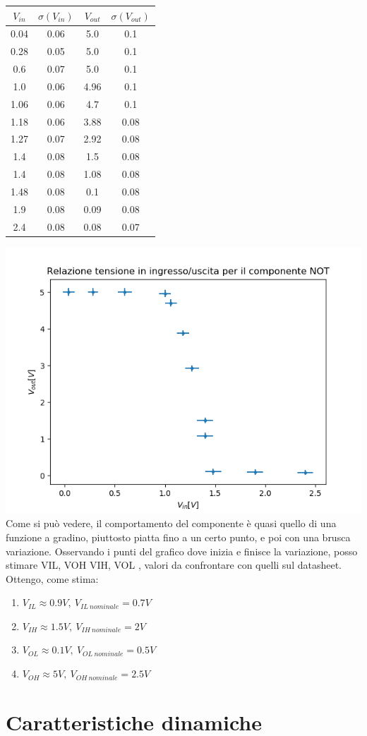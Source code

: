 \documentclass[10pt,a4paper]{article}
\begin{document}
	\begin{center}
\begin{tabular}{|c|c|c|c|}
	\hline 
	$V_{in}$ & $\sigma(V_{in})$ & $V_{out}$ & $\sigma(V_{out})$ \\ 
	\hline 
	0.04&0.06&5.0&0.1\\ \hline
	0.28&0.05&5.0&0.1\\ \hline
	0.6&0.07&5.0&0.1\\ \hline
	1.0&0.06&4.96&0.1\\ \hline
	1.06&0.06&4.7&0.1\\ \hline
	1.18&0.06&3.88&0.08\\ \hline
	1.27&0.07&2.92&0.08\\ \hline
	1.4&0.08&1.5&0.08\\ \hline
	1.4&0.08&1.08&0.08\\ \hline
	1.48&0.08&0.1&0.08\\ \hline
	1.9&0.08&0.09&0.08\\ \hline
	2.4&0.08&0.08&0.07\\ \hline
\end{tabular} 
	\end{center}
\includegraphics[scale=0.5]{gain.png}\centering
\\Come si può vedere, il comportamento del componente è quasi quello di una funzione a gradino, piuttosto piatta fino a un certo punto, e poi con una brusca variazione.
Osservando i punti del grafico dove inizia e finisce la variazione, posso stimare VIL, VOH  VIH, VOL , valori da confrontare con quelli sul datasheet.
\\Ottengo, come stima:
\begin{enumerate}
	\item $V_{IL}\approx0.9 V,~V_{IL~nominale}=0.7V$
	\item $V_{IH}		\approx 1.5V,~V_{IH~nominale}=2V$
	\item $V_{OL}\approx0.1V,~V_{OL~nominale}=0.5V$
	\item $V_{OH}\approx5V,~V_{OH~nominale}=2.5V$
\end{enumerate}

	\section{Caratteristiche dinamiche}
\end{document}
